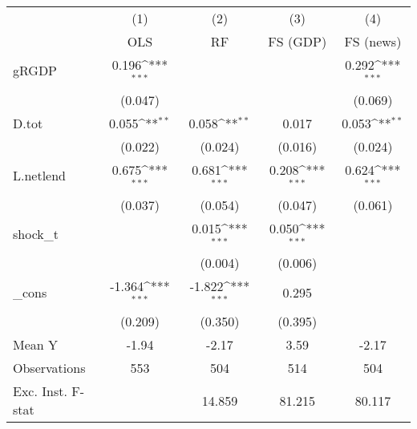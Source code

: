 {
\def\sym#1{\ifmmode^{#1}\else\(^{#1}\)\fi}
\begin{tabular}{l*{4}{c}}
\toprule
            &\multicolumn{1}{c}{(1)}&\multicolumn{1}{c}{(2)}&\multicolumn{1}{c}{(3)}&\multicolumn{1}{c}{(4)}\\
            &\multicolumn{1}{c}{OLS}&\multicolumn{1}{c}{RF}&\multicolumn{1}{c}{FS (GDP)}&\multicolumn{1}{c}{FS (news)}\\
\midrule
gRGDP       &       0.196\sym{***}&                     &                     &       0.292\sym{***}\\
            &     (0.047)         &                     &                     &     (0.069)         \\
\addlinespace
D.tot       &       0.055\sym{**} &       0.058\sym{**} &       0.017         &       0.053\sym{**} \\
            &     (0.022)         &     (0.024)         &     (0.016)         &     (0.024)         \\
\addlinespace
L.netlend   &       0.675\sym{***}&       0.681\sym{***}&       0.208\sym{***}&       0.624\sym{***}\\
            &     (0.037)         &     (0.054)         &     (0.047)         &     (0.061)         \\
\addlinespace
shock\_t     &                     &       0.015\sym{***}&       0.050\sym{***}&                     \\
            &                     &     (0.004)         &     (0.006)         &                     \\
\addlinespace
\_cons      &      -1.364\sym{***}&      -1.822\sym{***}&       0.295         &                     \\
            &     (0.209)         &     (0.350)         &     (0.395)         &                     \\
\midrule
Mean Y      &       -1.94         &       -2.17         &        3.59         &       -2.17         \\
Observations&         553         &         504         &         514         &         504         \\
Exc. Inst. F-stat&                     &      14.859         &      81.215         &      80.117         \\
\bottomrule
\end{tabular}
}
